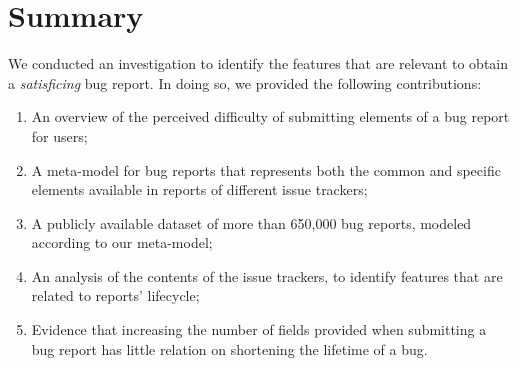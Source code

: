 %
%



\section{Summary} \label{sec:model-summary}

We conducted an investigation to identify the features that are relevant to obtain a \emph{satisficing} bug report.
In doing so, we provided the following contributions:

\begin{enumerate}

\item An overview of the perceived difficulty of submitting elements of a bug report for users;

\item A meta-model for bug reports that represents both the common and specific elements available in reports of different issue trackers;

\item A publicly available dataset of more than 650,000 bug reports, modeled according to our meta-model;

\item An analysis of the contents of the issue trackers, to identify features that are related to reports' lifecycle;

\item Evidence that increasing the number of fields provided when submitting a bug report has little relation on shortening the lifetime of a bug.

\end{enumerate}
